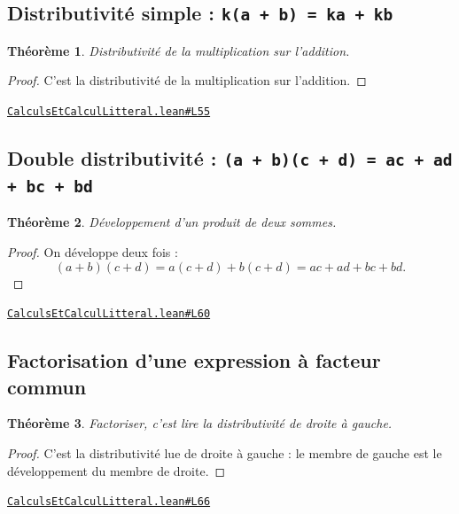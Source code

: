 \documentclass[11pt,a4paper]{article}
\theoremstyle{definition}
\theoremstyle{plain}
\newtheorem{theoreme}{Théorème}
\newcommand{\source}[2]{\par\smallskip\noindent\hfill{\footnotesize\href{#1}{\texttt{#2}}}\par\smallskip}
\begin{document}
\subsection{Distributivité simple : \texttt{k(a + b) = ka + kb}}

\begin{theoreme}
Distributivité de la multiplication sur l'addition.
\end{theoreme}

\begin{proof}
C'est la distributivité de la multiplication sur l'addition.
\end{proof}
\source{https://github.com/Commutator-IO/learn-lean/blob/main/courses/01-college/01-nombres-et-calculs/CalculsEtCalculLitteral.lean\#L55}{CalculsEtCalculLitteral.lean\#L55}

\subsection{Double distributivité : \texttt{(a + b)(c + d) = ac + ad + bc + bd}}

\begin{theoreme}
Développement d'un produit de deux sommes.
\end{theoreme}

\begin{proof}
On développe deux fois :
\[
(a+b)(c+d) = a(c+d) + b(c+d) = ac + ad + bc + bd .
\]
\end{proof}
\source{https://github.com/Commutator-IO/learn-lean/blob/main/courses/01-college/01-nombres-et-calculs/CalculsEtCalculLitteral.lean\#L60}{CalculsEtCalculLitteral.lean\#L60}

\subsection{Factorisation d'une expression à facteur commun}

\begin{theoreme}
Factoriser, c'est lire la distributivité de droite à gauche.
\end{theoreme}

\begin{proof}
C'est la distributivité lue de droite à gauche : le membre de gauche est le
développement du membre de droite.
\end{proof}
\source{https://github.com/Commutator-IO/learn-lean/blob/main/courses/01-college/01-nombres-et-calculs/CalculsEtCalculLitteral.lean\#L66}{CalculsEtCalculLitteral.lean\#L66}
\end{document}
